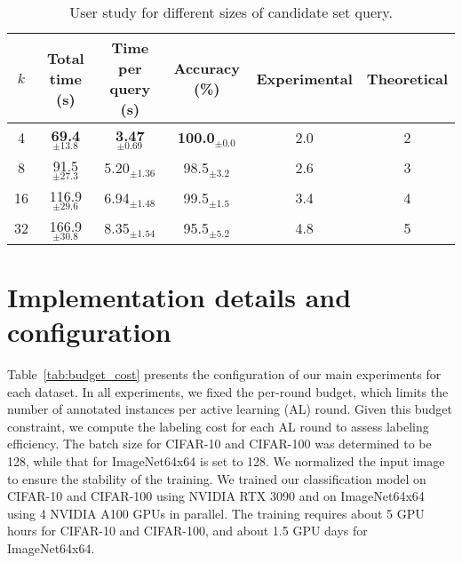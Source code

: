 \begin{table}[h!]
    \caption{User study for different sizes of candidate set query.}
    \label{tab:user-study-app}
    \begin{center}
        \begin{small}
            \setlength\tabcolsep{6pt}
            \centering
            \begin{tabular}{c|ccc|cc}
                \toprule
                $k$ & Total time (s) & Time per query (s) & Accuracy (\%) & Experimental & Theoretical \\ \midrule
                4 & \textbf{69.4$_{\pm 13.8}$} & \textbf{3.47$_{\pm 0.69}$} & \textbf{100.0$_{\pm 0.0}$} & 2.0 & 2 \\
                8 & 91.5$_{\pm 27.3}$ & 5.20$_{\pm 1.36}$ & 98.5$_{\pm 3.2}$ & 2.6 & 3 \\
                16 & 116.9$_{\pm 29.6}$ & 6.94$_{\pm 1.48}$ & 99.5$_{\pm 1.5}$ & 3.4 & 4 \\
                32 & 166.9$_{\pm 30.8}$ & 8.35$_{\pm 1.54}$ & 95.5$_{\pm 5.2}$ & 4.8 & 5 \\
                \bottomrule
            \end{tabular}
        \end{small}
    \end{center}
\end{table}

\section{Implementation details and configuration}
\label{app:impelment_details}

Table~\ref{tab:budget_cost} presents the configuration of our main experiments for each dataset. In all experiments, we fixed the per-round budget, which limits the number of annotated instances per active learning (AL) round. Given this budget constraint, we compute the labeling cost for each AL round to assess labeling efficiency.
The batch size for CIFAR-10 and CIFAR-100 was determined to be 128, while that for ImageNet64x64 is set to 128. We normalized the input image to ensure the stability of the training.
We trained our classification model on CIFAR-10 and CIFAR-100 using NVIDIA RTX 3090 and on ImageNet64x64 using 4 NVIDIA A100 GPUs in parallel. 
The training requires about 5 GPU hours for CIFAR-10 and CIFAR-100, and about 1.5 GPU days for ImageNet64x64.


